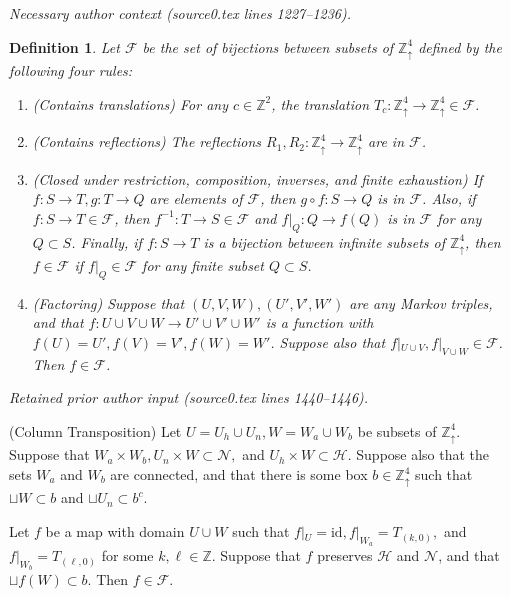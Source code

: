 \documentclass[10pt,a4paper]{amsart}
\newcommand{\X}{\times}
\newcommand{\Zd}{\mathds{Z}^4_\uparrow}
\newcommand{\Z}{\mathds{Z}}
\newcommand{\id}{\text{id}}
\newcommand{\scrF}{\mathcal{F}}
\newcommand{\scrH}{\mathcal{H}}
\newcommand{\scrN}{\mathcal{N}}
\newcommand{\sset}{\subset}
\newtheorem{definition}{Definition}
\begin{document}
\par\medskip\noindent\textit{Necessary author context (source0.tex lines 1227--1236).}\par\smallskip
\begin{definition}
	\label{D:scrF}
	Let $\scrF$ be the set of bijections between subsets of $\Zd$ defined by the following four rules: 
	\begin{enumerate}[nosep, label=(\roman*)]
		\item (Contains translations) For any $c \in \Z^2$, the translation $T_c:\Zd \to \Zd \in \scrF$.
		\item (Contains reflections) The reflections $R_1, R_2:\Zd \to \Zd$ are in $\scrF$.
		\item (Closed under restriction, composition, inverses, and finite exhaustion) If $f:S \to T, g:T \to Q$ are elements of $\scrF$, then $g \circ f:S \to Q$ is in $\scrF$. Also, if $f:S \to T \in \scrF$, then $f^{-1}:T \to S \in \scrF$ and $f|_{Q}:Q \to f(Q)$ is in $\scrF$ for any $Q \sset S$. Finally, if $f:S \to T$ is a bijection between infinite subsets of $\Zd$, then $f \in \scrF$ if $f|_{Q} \in \scrF$ for any finite subset $Q \sset S$. 
		\item (Factoring) Suppose that $(U, V, W), (U', V', W')$ are any Markov triples, and that $f:U \cup V \cup W \to U' \cup V' \cup W'$ is a function with $f(U) = U', f(V) = V', f(W) = W'$. Suppose also that $f|_{U \cup V}, f|_{V \cup W} \in \scrF$. Then $f \in \scrF$.
	\end{enumerate} 
\end{definition}

\par\medskip\noindent\textit{Retained prior author input (source0.tex lines 1440--1446).}\par\smallskip
\begin{prop}
	\label{P:basic-perm} (Column Transposition)
	Let
	$U = U_h \cup U_n, W = W_a \cup W_b$ be subsets of $\Zd$. Suppose that $W_a \X W_b, U_n \X W \sset \scrN,$ and $U_h \X W \sset \scrH$. Suppose also that the sets $W_a$ and $W_b$ are connected, and that there is some box $b \in \Zd$ such that $\sqcup W \sset b$ and $\sqcup U_n \sset b^c$.
	
	Let $f$ be a map with domain $U \cup W$ such that $f|_U = \id, f|_{W_a} = T_{(k, 0)},$ and $f|_{W_b} = T_{(\ell, 0)}$ for some $k, \ell \in \Z$. Suppose that $f$ preserves $\scrH$ and $\scrN$, and that $\sqcup f(W) \sset b$. Then $f \in \scrF$.
\end{prop}
\end{document}
